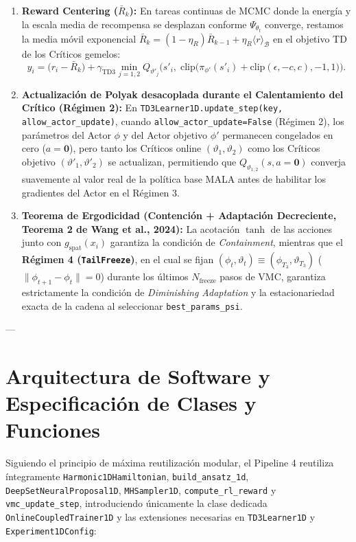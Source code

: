 \documentclass[10pt,a4paper]{article}
\begin{document}
\begin{enumerate}
\item \textbf{Reward Centering ($\bar{R}_k$):} En tareas continuas de MCMC donde la energ\'ia y la escala media de recompensa se desplazan conforme $\Psi_{\theta_t}$ converge, restamos la media m\'ovil exponencial $\bar{R}_k = (1 - \eta_R)\bar{R}_{k-1} + \eta_R \langle r \rangle_{\mathcal{B}}$ en el objetivo TD de los Cr\'iticos gemelos:
\begin{equation}
y_i = \big(r_i - \bar{R}_k\big) + \gamma_{\mathrm{TD3}} \min_{j=1,2} Q_{\vartheta'_j}\!\Big(s'_i,\; \mathrm{clip}\big(\pi_{\phi'}(s'_i) + \mathrm{clip}(\epsilon, -c, c), -1, 1\big)\Big).
\label{eq:bellman_centered}
\end{equation}
\item \textbf{Actualizaci\'on de Polyak desacoplada durante el Calentamiento del Cr\'itico (R\'egimen 2):} En \texttt{TD3Learner1D.update\_step(key, allow\_actor\_update)}, cuando \texttt{allow\_actor\_update=False} (R\'egimen 2), los par\'ametros del Actor $\phi$ y del Actor objetivo $\phi'$ permanecen congelados en cero ($a=\bm{0}$), pero tanto los Cr\'iticos online $(\vartheta_1, \vartheta_2)$ como los Cr\'iticos objetivo $(\vartheta'_1, \vartheta'_2)$ se actualizan, permitiendo que $Q_{\vartheta_{1,2}}(s, a=\bm{0})$ converja suavemente al valor real de la pol\'itica base MALA antes de habilitar los gradientes del Actor en el R\'egimen 3.
\item \textbf{Teorema de Ergodicidad (Contenci\'on + Adaptaci\'on Decreciente, Teorema 2 de Wang et al., 2024):} La acotaci\'on $\tanh$ de las acciones junto con $g_{\mathrm{spat}}(x_i)$ garantiza la condici\'on de \textit{Containment}, mientras que el \textbf{R\'egimen 4 (\texttt{TailFreeze})}, en el cual se fijan $(\phi_t, \vartheta_t) \equiv (\phi_{T_3}, \vartheta_{T_3})$ ($\|\phi_{t+1} - \phi_t\| = 0$) durante los \'ultimos $N_{\mathrm{freeze}}$ pasos de VMC, garantiza estrictamente la condici\'on de \textit{Diminishing Adaptation} y la estacionariedad exacta de la cadena al seleccionar \texttt{best\_params\_psi}.
\end{enumerate}

---

\section{Arquitectura de Software y Especificaci\'on de Clases y Funciones}

Siguiendo el principio de m\'axima reutilizaci\'on modular, el Pipeline 4 reutiliza \'integramente \texttt{Harmonic1DHamiltonian}, \texttt{build\_ansatz\_1d}, \texttt{DeepSetNeuralProposal1D}, \texttt{MHSampler1D}, \texttt{compute\_rl\_reward} y \texttt{vmc\_update\_step}, introduciendo \'unicamente la clase dedicada \texttt{OnlineCoupledTrainer1D} y las extensiones necesarias en \texttt{TD3Learner1D} y \texttt{Experiment1DConfig}:
\end{document}
